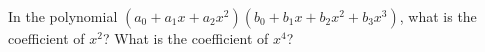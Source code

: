 \documentclass{book}
\begin{document}
\setcounter{cpjt}{245}
\addtocounter{cpjt}{-1}
\begin{activity}\label{coeffinproduct}
\hypertarget{p-1283}{}%
In the polynomial \((a_0 +a_1x+a_2x^2)(b_0+b_1x+b_2x^2+b_3x^3)\), what is the coefficient of \(x^2\)? What is the coefficient of \(x^4\)?%
\par\smallskip%
\noindent\end{activity}

\clearpage
\end{document}

